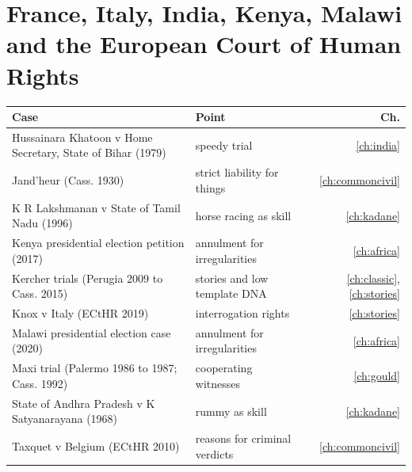 \section*{France, Italy, India, Kenya, Malawi and the European Court of Human Rights}
\begin{longtable}{>{\raggedright\arraybackslash}p{3.7cm} >{\raggedright\arraybackslash}p{5.6cm} r}
\toprule
Case & Point & Ch.\\
\midrule
Hussainara Khatoon v Home Secretary, State of Bihar (1979) & speedy trial & \ref{ch:india}\\
Jand'heur (Cass. 1930) & strict liability for things & \ref{ch:commoncivil}\\
K R Lakshmanan v State of Tamil Nadu (1996) & horse racing as skill & \ref{ch:kadane}\\
Kenya presidential election petition (2017) & annulment for irregularities & \ref{ch:africa}\\
Kercher trials (Perugia 2009 to Cass. 2015) & stories and low template DNA & \ref{ch:classic}, \ref{ch:stories}\\
Knox v Italy (ECtHR 2019) & interrogation rights & \ref{ch:stories}\\
Malawi presidential election case (2020) & annulment for irregularities & \ref{ch:africa}\\
Maxi trial (Palermo 1986 to 1987; Cass. 1992) & cooperating witnesses & \ref{ch:gould}\\
State of Andhra Pradesh v K Satyanarayana (1968) & rummy as skill & \ref{ch:kadane}\\
Taxquet v Belgium (ECtHR 2010) & reasons for criminal verdicts & \ref{ch:commoncivil}\\
\bottomrule
\end{longtable}
\normalsize
